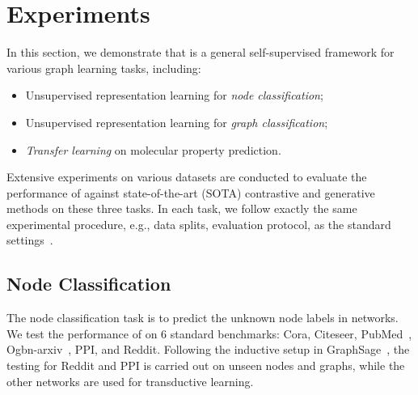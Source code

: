 \section{Experiments}%
\label{sec:experiments}

In this section, we demonstrate that \model  is a general self-supervised framework for various graph learning tasks, including:
\begin{itemize}[leftmargin=*,itemsep=0pt,parsep=0.5em,topsep=0.3em,partopsep=0.3em]
    \item Unsupervised representation learning for \textit{node classification};
    \item Unsupervised representation learning for \textit{graph classification};
    \item \textit{Transfer learning} on molecular property prediction.
\end{itemize}
Extensive experiments on various datasets are conducted to evaluate 
the performance of \model against state-of-the-art (SOTA) contrastive and generative methods on these three tasks. 
In each task, we follow exactly the same experimental procedure, e.g., data splits, evaluation protocol, as the  standard settings~\cite{velivckovic2018deep,zhang2021canonical,sun2019infograph,hu2020strategies}. 


\subsection{Node Classification}



The node classification task is to predict the unknown node labels in networks. 
We test the performance of \model on 6 standard benchmarks: Cora, Citeseer, PubMed~\cite{yang2016revisiting}, Ogbn-arxiv~\cite{hu2020open}, PPI, and Reddit. 
Following the inductive setup in GraphSage~\cite{hamilton2017inductive}, the testing for Reddit and PPI is carried out on unseen nodes and graphs, while the other networks are used for transductive learning.


